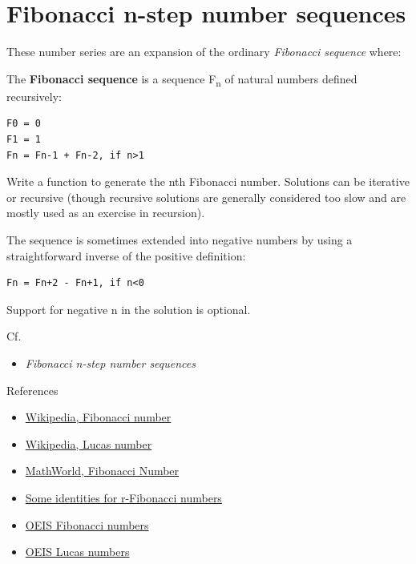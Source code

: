 \pagebreak{}
\section*{Fibonacci n-step number sequences}

These number series are an expansion of the ordinary
\emph{Fibonacci sequence} where:


The \textbf{Fibonacci sequence} is a sequence F\textsubscript{n} of
natural numbers defined recursively:

\begin{verbatim}
F0 = 0
F1 = 1
Fn = Fn-1 + Fn-2, if n>1
\end{verbatim}

Write a function to generate the nth Fibonacci number. Solutions can be
iterative or recursive (though recursive solutions are generally
considered too slow and are mostly used as an exercise in recursion).

The sequence is sometimes extended into negative numbers by using a
straightforward inverse of the positive definition:

\begin{verbatim}
Fn = Fn+2 - Fn+1, if n<0
\end{verbatim}

Support for negative n in the solution is optional.

\begin{description}
\item[Cf.]
\end{description}

\begin{itemize}
\item \emph{Fibonacci n-step number sequences‎}
\end{itemize}

\begin{description}
\item[References]
\end{description}

\begin{itemize}
\item
  \href{http://en.wikipedia.org/wiki/Fibonacci\_number}{Wikipedia,
  Fibonacci number}
\item
  \href{http://en.wikipedia.org/wiki/Lucas\_number}{Wikipedia, Lucas
  number}
\item
  \href{http://mathworld.wolfram.com/FibonacciNumber.html}{MathWorld,
  Fibonacci Number}
\item
  \href{http://www.math-cs.ucmo.edu/~curtisc/articles/howardcooper/genfib4.pdf}{Some
  identities for r-Fibonacci numbers}
\item
  \href{http://oeis.org/A000045}{OEIS Fibonacci numbers}
\item
  \href{http://oeis.org/A000032}{OEIS Lucas numbers}
\end{itemize}



